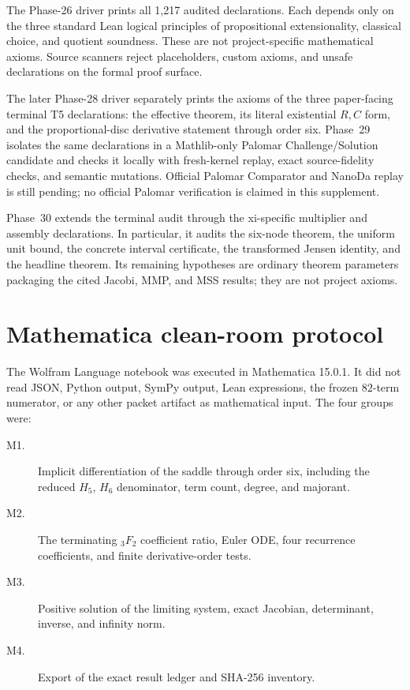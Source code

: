 \documentclass[10pt]{article}
\begin{document}
The Phase-26 driver  prints all 1,217 audited
declarations.  Each
depends only on the three standard Lean logical principles of propositional
extensionality, classical choice, and quotient soundness.  These are not
project-specific mathematical axioms.  Source scanners reject placeholders,
custom axioms, and unsafe declarations on the formal proof surface.

The later Phase-28 driver separately prints the axioms of the three
paper-facing terminal T5 declarations: the effective theorem, its literal
existential $R,C$ form, and the proportional-disc derivative statement
through order six.  Phase~29 isolates the same declarations in a
Mathlib-only Palomar Challenge/Solution candidate and checks it locally with
fresh-kernel replay, exact source-fidelity checks, and semantic mutations.
Official Palomar Comparator and NanoDa replay is still pending; no official
Palomar verification is claimed in this supplement.

Phase~30 extends the terminal audit through the xi-specific multiplier and
assembly declarations.  In particular, it audits the six-node theorem, the
uniform unit bound, the concrete interval certificate, the transformed
Jensen identity, and the headline theorem.  Its remaining hypotheses are
ordinary theorem parameters packaging the cited Jacobi, MMP, and MSS
results; they are not project axioms.

\section{Mathematica clean-room protocol}\label{sup:mathematica}

The Wolfram Language notebook was executed in Mathematica 15.0.1.  It did not
read JSON, Python output, SymPy output, Lean expressions, the frozen
$82$-term numerator, or any other packet artifact as mathematical input.
The four groups were:
\begin{description}
\item[M1.] Implicit differentiation of the saddle through order six,
including the reduced $H_5$, $H_6$ denominator, term count, degree, and
majorant.
\item[M2.] The terminating ${}_3F_2$ coefficient ratio, Euler ODE, four
recurrence coefficients, and finite derivative-order tests.
\item[M3.] Positive solution of the limiting system, exact Jacobian,
determinant, inverse, and infinity norm.
\item[M4.] Export of the exact result ledger and SHA-256 inventory.
\end{description}
\end{document}
